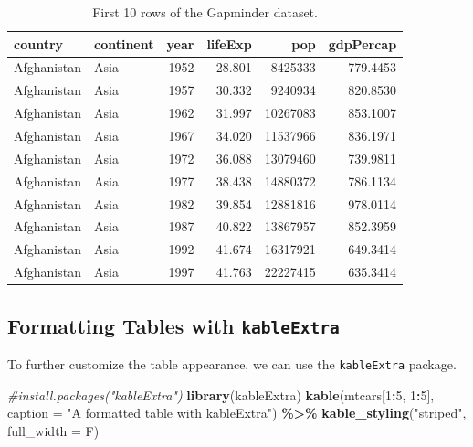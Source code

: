 \documentclass[
]{book}
\newenvironment{Shaded}{\begin{snugshade}}{\end{snugshade}}
\newcommand{\AttributeTok}[1]{\textcolor[rgb]{0.13,0.29,0.53}{#1}}
\newcommand{\CommentTok}[1]{\textcolor[rgb]{0.56,0.35,0.01}{\textit{#1}}}
\newcommand{\DecValTok}[1]{\textcolor[rgb]{0.00,0.00,0.81}{#1}}
\newcommand{\FunctionTok}[1]{\textcolor[rgb]{0.13,0.29,0.53}{\textbf{#1}}}
\newcommand{\NormalTok}[1]{#1}
\newcommand{\SpecialCharTok}[1]{\textcolor[rgb]{0.81,0.36,0.00}{\textbf{#1}}}
\newcommand{\StringTok}[1]{\textcolor[rgb]{0.31,0.60,0.02}{#1}}
\begin{document}
\begin{table}

\caption{\label{tab:unnamed-chunk-2}First 10 rows of the Gapminder dataset.}
\centering
\begin{tabular}[t]{l|l|r|r|r|r}
\hline
country & continent & year & lifeExp & pop & gdpPercap\\
\hline
Afghanistan & Asia & 1952 & 28.801 & 8425333 & 779.4453\\
\hline
Afghanistan & Asia & 1957 & 30.332 & 9240934 & 820.8530\\
\hline
Afghanistan & Asia & 1962 & 31.997 & 10267083 & 853.1007\\
\hline
Afghanistan & Asia & 1967 & 34.020 & 11537966 & 836.1971\\
\hline
Afghanistan & Asia & 1972 & 36.088 & 13079460 & 739.9811\\
\hline
Afghanistan & Asia & 1977 & 38.438 & 14880372 & 786.1134\\
\hline
Afghanistan & Asia & 1982 & 39.854 & 12881816 & 978.0114\\
\hline
Afghanistan & Asia & 1987 & 40.822 & 13867957 & 852.3959\\
\hline
Afghanistan & Asia & 1992 & 41.674 & 16317921 & 649.3414\\
\hline
Afghanistan & Asia & 1997 & 41.763 & 22227415 & 635.3414\\
\hline
\end{tabular}
\end{table}

\hypertarget{formatting-tables-with-kableextra}{%
\subsection{\texorpdfstring{Formatting Tables with \texttt{kableExtra}}{Formatting Tables with kableExtra}}\label{formatting-tables-with-kableextra}}

To further customize the table appearance, we can use the \texttt{kableExtra} package.

\begin{Shaded}
\begin{Highlighting}[]
\CommentTok{\#install.packages("kableExtra") }
\FunctionTok{library}\NormalTok{(kableExtra)}
\FunctionTok{kable}\NormalTok{(mtcars[}\DecValTok{1}\SpecialCharTok{:}\DecValTok{5}\NormalTok{, }\DecValTok{1}\SpecialCharTok{:}\DecValTok{5}\NormalTok{], }\AttributeTok{caption =} \StringTok{"A formatted table with kableExtra"}\NormalTok{) }\SpecialCharTok{\%\textgreater{}\%}
  \FunctionTok{kable\_styling}\NormalTok{(}\StringTok{"striped"}\NormalTok{, }\AttributeTok{full\_width =}\NormalTok{ F)}
\end{Highlighting}
\end{Shaded}
\end{document}
